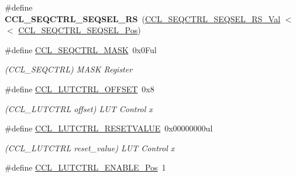 \begin{DoxyCompactItemize}
\item 
\hypertarget{group___s_a_m_l21___c_c_l_ga6108b173bbbdc3cfdf1545aab98d92b2}{}\#define {\bfseries C\+C\+L\+\_\+\+S\+E\+Q\+C\+T\+R\+L\+\_\+\+S\+E\+Q\+S\+E\+L\+\_\+\+R\+S}~(\hyperlink{group___s_a_m_l21___c_c_l_ga190ccdf8b60ec2ab4a231060bcafa23d}{C\+C\+L\+\_\+\+S\+E\+Q\+C\+T\+R\+L\+\_\+\+S\+E\+Q\+S\+E\+L\+\_\+\+R\+S\+\_\+\+Val}     $<$$<$ \hyperlink{group___s_a_m_l21___c_c_l_gab6ac81501f16a9835f3eee86922b8f3e}{C\+C\+L\+\_\+\+S\+E\+Q\+C\+T\+R\+L\+\_\+\+S\+E\+Q\+S\+E\+L\+\_\+\+Pos})\label{group___s_a_m_l21___c_c_l_ga6108b173bbbdc3cfdf1545aab98d92b2}

\item 
\hypertarget{group___s_a_m_l21___c_c_l_ga476f638353d236d389f6dd16c8078961}{}\#define \hyperlink{group___s_a_m_l21___c_c_l_ga476f638353d236d389f6dd16c8078961}{C\+C\+L\+\_\+\+S\+E\+Q\+C\+T\+R\+L\+\_\+\+M\+A\+S\+K}~0x0\+Ful\label{group___s_a_m_l21___c_c_l_ga476f638353d236d389f6dd16c8078961}

\begin{DoxyCompactList}\small\item\em (C\+C\+L\+\_\+\+S\+E\+Q\+C\+T\+R\+L) M\+A\+S\+K Register \end{DoxyCompactList}\item 
\hypertarget{group___s_a_m_l21___c_c_l_ga8c1fe1bc471d0b506a046d512a541910}{}\#define \hyperlink{group___s_a_m_l21___c_c_l_ga8c1fe1bc471d0b506a046d512a541910}{C\+C\+L\+\_\+\+L\+U\+T\+C\+T\+R\+L\+\_\+\+O\+F\+F\+S\+E\+T}~0x8\label{group___s_a_m_l21___c_c_l_ga8c1fe1bc471d0b506a046d512a541910}

\begin{DoxyCompactList}\small\item\em (C\+C\+L\+\_\+\+L\+U\+T\+C\+T\+R\+L offset) L\+U\+T Control x \end{DoxyCompactList}\item 
\hypertarget{group___s_a_m_l21___c_c_l_ga12c422ed3e6af4d13870470ae9b20f4d}{}\#define \hyperlink{group___s_a_m_l21___c_c_l_ga12c422ed3e6af4d13870470ae9b20f4d}{C\+C\+L\+\_\+\+L\+U\+T\+C\+T\+R\+L\+\_\+\+R\+E\+S\+E\+T\+V\+A\+L\+U\+E}~0x00000000ul\label{group___s_a_m_l21___c_c_l_ga12c422ed3e6af4d13870470ae9b20f4d}

\begin{DoxyCompactList}\small\item\em (C\+C\+L\+\_\+\+L\+U\+T\+C\+T\+R\+L reset\+\_\+value) L\+U\+T Control x \end{DoxyCompactList}\item 
\hypertarget{group___s_a_m_l21___c_c_l_ga1672d51c49fc156354197e7f97e73983}{}\#define \hyperlink{group___s_a_m_l21___c_c_l_ga1672d51c49fc156354197e7f97e73983}{C\+C\+L\+\_\+\+L\+U\+T\+C\+T\+R\+L\+\_\+\+E\+N\+A\+B\+L\+E\+\_\+\+Pos}~1\label{group___s_a_m_l21___c_c_l_ga1672d51c49fc156354197e7f97e73983}


\end{DoxyCompactItemize}
